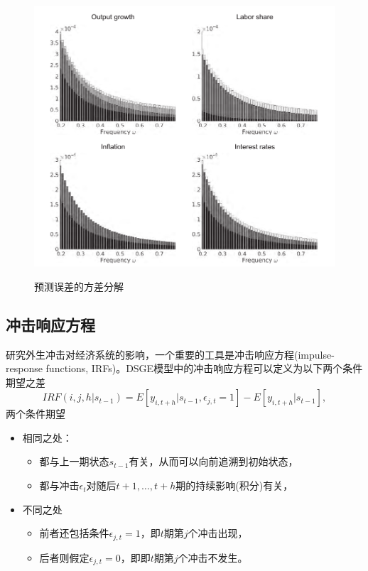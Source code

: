 \begin{figure}[htbp]
  \caption{预测误差的方差分解}
  \centering
  \includegraphics[width=12cm]{./Figures/20180403-spectral-decomposition}
  \label{fig:stylized-ssrep-spectral-decomposition}
%
\end{figure}

\subsection{冲击响应方程}
\label{sec:stylized-ssrep-irfs}
研究外生冲击对经济系统的影响，一个重要的工具是冲击响应方程(impulse-response functions, IRFs)。DSGE模型中的冲击响应方程可以定义为以下两个条件期望之差
\begin{equation}
  \label{eq:stylized-ssrep-irfs-def}
  IRF \left( i, j, h | s_{t-1} \right) =
  E \left[ y_{i,t+h} | s_{t-1}, \epsilon_{j,t}=1 \right]
  - E \left[ y_{i,t+h} | s_{t-1} \right],
\end{equation}
两个条件期望
\begin{itemize}
  \item 相同之处：
  \begin{itemize}
    \item 都与上一期状态$s_{t-1}$有关，从而可以向前追溯到初始状态，
    \item 都与冲击$\epsilon_{t}$对随后$t+1,\ldots,t+h$期的持续影响(积分)有关，
  \end{itemize}
  \item 不同之处
  \begin{itemize}
    \item 前者还包括条件$\epsilon_{j,t}=1$，即$t$期第$j$个冲击出现，
    \item 后者则假定$\epsilon_{j,t}=0$，即即$t$期第$j$个冲击不发生。
  \end{itemize}
\end{itemize}


